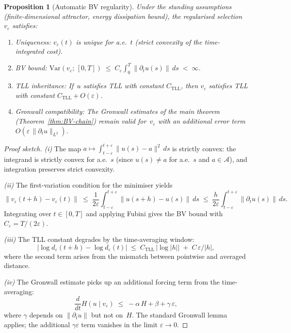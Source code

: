 \documentclass[12pt,a4paper]{article}
\theoremstyle{definition}
\theoremstyle{plain}
\newtheorem{proposition}[definition]{Proposition}
\theoremstyle{remark}
\newcommand{\Var}{\mathrm{Var}}
\begin{document}
\begin{proposition}[Automatic BV regularity]
\label{prop:bv-regularity}
Under the standing assumptions (finite-dimensional attractor, energy
dissipation bound), the regularised selection~$v_\varepsilon$ satisfies:
\begin{enumerate}[label=(\roman*)]
\item \emph{Uniqueness:}  $v_\varepsilon(t)$ is unique for a.e.~$t$
  (strict convexity of the time-integrated cost).
\item \emph{BV bound:}
  $\Var(v_\varepsilon;\,[0,T])
   \;\le\;
   C_\varepsilon
   \int_0^T \|\partial_t u(s)\|\,ds
   \;<\; \infty$.
\item \emph{TLL inheritance:}  If~$u$ satisfies TLL with constant
  $C_{\mathrm{TLL}}$, then $v_\varepsilon$ satisfies TLL with
  constant $C_{\mathrm{TLL}} + O(\varepsilon)$.
\item \emph{Gronwall compatibility:}  The Gronwall estimates of the
  main theorem (Theorem~\ref{thm:BV-chain}) remain valid
  for~$v_\varepsilon$ with an additional error term
  $O(\varepsilon\,\|\partial_t u\|_{L^2})$.
\end{enumerate}
\end{proposition}

\begin{proof}[Proof sketch]
\emph{(i)}\; The map
$a \mapsto \int_{t-\varepsilon}^{t+\varepsilon} \|u(s)-a\|^2\,ds$
is strictly convex: the integrand is strictly convex for a.e.~$s$
(since $u(s) \neq a$ for a.e.~$s$ and $a \in \mathcal{A}$), and
integration preserves strict convexity.

\emph{(ii)}\; The first-variation condition for the minimiser yields
\[
  \|v_\varepsilon(t+h) - v_\varepsilon(t)\|
  \;\le\;
  \frac{1}{2\varepsilon}
  \int_{t-\varepsilon}^{t+\varepsilon}
  \|u(s+h) - u(s)\|\,ds
  \;\le\;
  \frac{h}{2\varepsilon}
  \int_{t-\varepsilon}^{t+\varepsilon}
  \|\partial_t u(s)\|\,ds.
\]
Integrating over $t \in [0,T]$ and applying Fubini gives the BV bound
with $C_\varepsilon = T/(2\varepsilon)$.

\emph{(iii)}\; The TLL constant degrades by the time-averaging window:
\[
  |\log d_\varepsilon(t+h) - \log d_\varepsilon(t)|
  \;\le\;
  C_{\mathrm{TLL}}\,|\log|h||
  \;+\;
  C\,\varepsilon/|h|,
\]
where the second term arises from the mismatch between pointwise and
averaged distance.

\emph{(iv)}\; The Gronwall estimate picks up an additional forcing
term from the time-averaging:
\[
  \frac{d}{dt} H(u \mid v_\varepsilon)
  \;\le\;
  -\alpha\,H + \beta + \gamma\,\varepsilon,
\]
where $\gamma$ depends on $\|\partial_t u\|$ but not on~$H$.
The standard Gronwall lemma applies; the additional
$\gamma\varepsilon$ term vanishes in the limit
$\varepsilon \to 0$.
\end{proof}
\end{document}
